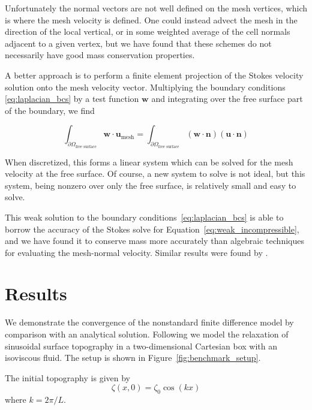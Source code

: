 \documentclass[preprint,12pt,authoryear]{elsarticle}
\begin{document}
Unfortunately the normal vectors are not well defined on the mesh vertices, which is 
where the mesh velocity is defined. One could instead advect the mesh in the direction 
of the local vertical, or in some weighted average of the cell normals adjacent to a given vertex,
but we have found that these schemes do not necessarily have good mass conservation 
properties.

A better approach is to perform a finite element projection of the Stokes velocity 
solution onto the mesh velocity vector. Multiplying the boundary conditions 
\eqref{eq:laplacian_bcs} by a test function $\mathbf{w}$ and integrating over the free
surface part of the boundary, we find

\begin{equation}
\int_{\partial \Omega_{\textrm{free surface}} } \mathbf{w} \cdot \mathbf{u}_\mathrm{mesh} = 
\int_{\partial \Omega_{\textrm{free surface}} } \left( \mathbf{w \cdot n } \right) \left( \mathbf{u \cdot n} \right)
\end{equation}

When discretized, this forms a linear system which can be solved for the mesh velocity at the 
free surface. Of course, a new system to solve is not ideal, but this system, being nonzero 
over only the free surface, is relatively small and easy to solve.

This weak solution to the boundary conditions~\eqref{eq:laplacian_bcs} is able to borrow
the accuracy of the Stokes solve for Equation~\eqref{eq:weak_incompressible}, and we have 
found it to conserve mass more accurately than algebraic techniques for evaluating the mesh-normal velocity.
Similar results were found by \citet{fullsack1995arbitrary}.

\section{Results}

We demonstrate the convergence of the nonstandard finite difference model by comparison 
with an analytical solution. Following \citet{kramer2012implicit} we model the relaxation
of sinusoidal surface topography in a two-dimensional Cartesian box with an isoviscous fluid.
The setup is shown in Figure~\ref{fig:benchmark_setup}.

The initial topography is given by
\begin{equation}
\zeta(x,0) = \zeta_0 \cos\left( k x \right)
\end{equation}
where $k = 2 \pi / L$.
\end{document}
